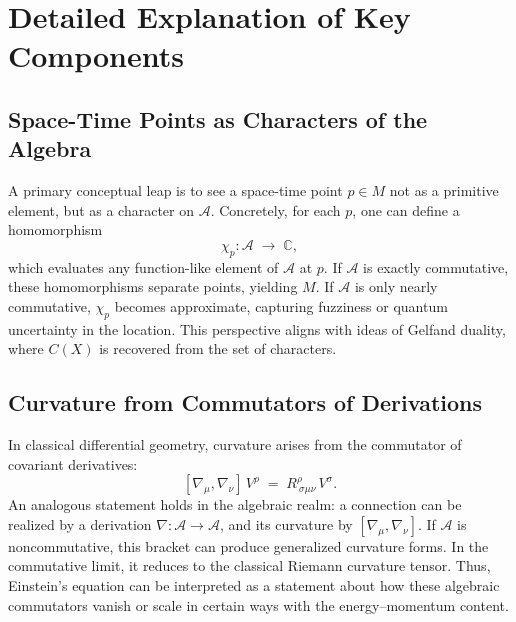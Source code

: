 \documentclass[11pt]{article}
\begin{document}
\section{Detailed Explanation of Key Components}
\label{sec:key-components}

\subsection{Space-Time Points as Characters of the Algebra}
A primary conceptual leap is to see a space-time point $p\in M$ not as a primitive element, but as a character on $\mathcal{A}$. Concretely, for each $p$, one can define a homomorphism
\[
\chi_p: \mathcal{A} \;\to\; \mathbb{C}, 
\]
which evaluates any function-like element of $\mathcal{A}$ at $p$. If $\mathcal{A}$ is exactly commutative, these homomorphisms separate points, yielding $M$. If $\mathcal{A}$ is only nearly commutative, $\chi_p$ becomes approximate, capturing fuzziness or quantum uncertainty in the location. This perspective aligns with ideas of Gelfand duality, where $C(X)$ is recovered from the set of characters. 

\subsection{Curvature from Commutators of Derivations}
In classical differential geometry, curvature arises from the commutator of covariant derivatives:
\[
[\nabla_\mu, \nabla_\nu]\,V^\rho \;=\; R^\rho_{\ \sigma\mu\nu}\,V^\sigma.
\]
An analogous statement holds in the algebraic realm: a connection can be realized by a derivation $\nabla: \mathcal{A}\to \mathcal{A}$, and its curvature by $[\nabla_\mu,\nabla_\nu]$. If $\mathcal{A}$ is noncommutative, this bracket can produce generalized curvature forms. In the commutative limit, it reduces to the classical Riemann curvature tensor. Thus, Einstein’s equation can be interpreted as a statement about how these algebraic commutators vanish or scale in certain ways with the energy–momentum content.
\end{document}
